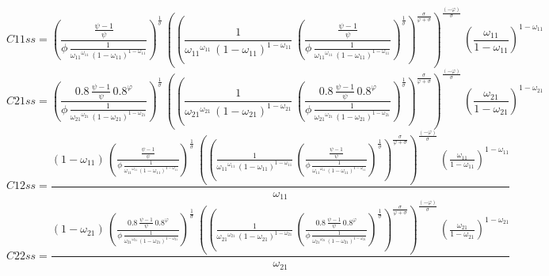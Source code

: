 \begin{dmath*}
C11ss = \left(\frac{\frac{{{\psi}}-1}{{{\psi}}}}{{{\phi}}\, \frac{1}{{{\omega_{11}}}^{{{\omega_{11}}}}\, \left(1-{{\omega_{11}}}\right)^{1-{{\omega_{11}}}}}}\right)^{\frac{1}{{{\sigma}}}}\, \left(\left(\frac{1}{{{\omega_{11}}}^{{{\omega_{11}}}}\, \left(1-{{\omega_{11}}}\right)^{1-{{\omega_{11}}}}}\, \left(\frac{\frac{{{\psi}}-1}{{{\psi}}}}{{{\phi}}\, \frac{1}{{{\omega_{11}}}^{{{\omega_{11}}}}\, \left(1-{{\omega_{11}}}\right)^{1-{{\omega_{11}}}}}}\right)^{\frac{1}{{{\sigma}}}}\right)^{\frac{{{\sigma}}}{{{\varphi}}+{{\sigma}}}}\right)^{\frac{\left(-{{\varphi}}\right)}{{{\sigma}}}}\, \left(\frac{{{\omega_{11}}}}{1-{{\omega_{11}}}}\right)^{1-{{\omega_{11}}}}
\end{dmath*}
\begin{dmath*}
C21ss = \left(\frac{0.8\, \frac{{{\psi}}-1}{{{\psi}}}\, 0.8^{{{\varphi}}}}{{{\phi}}\, \frac{1}{{{\omega_{21}}}^{{{\omega_{21}}}}\, \left(1-{{\omega_{21}}}\right)^{1-{{\omega_{21}}}}}}\right)^{\frac{1}{{{\sigma}}}}\, \left(\left(\frac{1}{{{\omega_{21}}}^{{{\omega_{21}}}}\, \left(1-{{\omega_{21}}}\right)^{1-{{\omega_{21}}}}}\, \left(\frac{0.8\, \frac{{{\psi}}-1}{{{\psi}}}\, 0.8^{{{\varphi}}}}{{{\phi}}\, \frac{1}{{{\omega_{21}}}^{{{\omega_{21}}}}\, \left(1-{{\omega_{21}}}\right)^{1-{{\omega_{21}}}}}}\right)^{\frac{1}{{{\sigma}}}}\right)^{\frac{{{\sigma}}}{{{\varphi}}+{{\sigma}}}}\right)^{\frac{\left(-{{\varphi}}\right)}{{{\sigma}}}}\, \left(\frac{{{\omega_{21}}}}{1-{{\omega_{21}}}}\right)^{1-{{\omega_{21}}}}
\end{dmath*}
\begin{dmath*}
C12ss = \frac{\left(1-{{\omega_{11}}}\right)\, \left(\frac{\frac{{{\psi}}-1}{{{\psi}}}}{{{\phi}}\, \frac{1}{{{\omega_{11}}}^{{{\omega_{11}}}}\, \left(1-{{\omega_{11}}}\right)^{1-{{\omega_{11}}}}}}\right)^{\frac{1}{{{\sigma}}}}\, \left(\left(\frac{1}{{{\omega_{11}}}^{{{\omega_{11}}}}\, \left(1-{{\omega_{11}}}\right)^{1-{{\omega_{11}}}}}\, \left(\frac{\frac{{{\psi}}-1}{{{\psi}}}}{{{\phi}}\, \frac{1}{{{\omega_{11}}}^{{{\omega_{11}}}}\, \left(1-{{\omega_{11}}}\right)^{1-{{\omega_{11}}}}}}\right)^{\frac{1}{{{\sigma}}}}\right)^{\frac{{{\sigma}}}{{{\varphi}}+{{\sigma}}}}\right)^{\frac{\left(-{{\varphi}}\right)}{{{\sigma}}}}\, \left(\frac{{{\omega_{11}}}}{1-{{\omega_{11}}}}\right)^{1-{{\omega_{11}}}}}{{{\omega_{11}}}}
\end{dmath*}
\begin{dmath*}
C22ss = \frac{\left(1-{{\omega_{21}}}\right)\, \left(\frac{0.8\, \frac{{{\psi}}-1}{{{\psi}}}\, 0.8^{{{\varphi}}}}{{{\phi}}\, \frac{1}{{{\omega_{21}}}^{{{\omega_{21}}}}\, \left(1-{{\omega_{21}}}\right)^{1-{{\omega_{21}}}}}}\right)^{\frac{1}{{{\sigma}}}}\, \left(\left(\frac{1}{{{\omega_{21}}}^{{{\omega_{21}}}}\, \left(1-{{\omega_{21}}}\right)^{1-{{\omega_{21}}}}}\, \left(\frac{0.8\, \frac{{{\psi}}-1}{{{\psi}}}\, 0.8^{{{\varphi}}}}{{{\phi}}\, \frac{1}{{{\omega_{21}}}^{{{\omega_{21}}}}\, \left(1-{{\omega_{21}}}\right)^{1-{{\omega_{21}}}}}}\right)^{\frac{1}{{{\sigma}}}}\right)^{\frac{{{\sigma}}}{{{\varphi}}+{{\sigma}}}}\right)^{\frac{\left(-{{\varphi}}\right)}{{{\sigma}}}}\, \left(\frac{{{\omega_{21}}}}{1-{{\omega_{21}}}}\right)^{1-{{\omega_{21}}}}}{{{\omega_{21}}}}
\end{dmath*}
